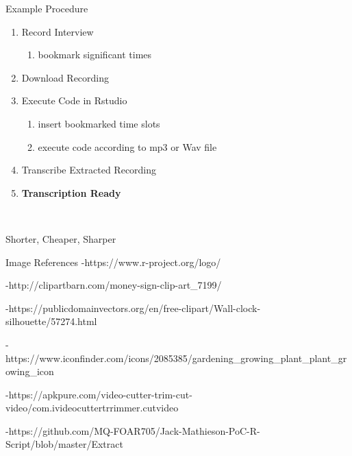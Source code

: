 \documentclass{beamer}
\begin{document}
\begin{frame}{Example Procedure}
\begin{enumerate}[I]
    \item{Record Interview}
\begin{enumerate}
    \item bookmark significant times
\end{enumerate}
    \item{Download Recording}
    \item{Execute Code in Rstudio}
\begin{enumerate}
    \item insert bookmarked time slots
    \item{execute code according to mp3 or Wav file}
\end{enumerate}
    \item{Transcribe Extracted Recording}
    \item{\textbf{Transcription Ready}}
\end{enumerate}
\    

\centering Shorter, Cheaper, Sharper
\end{frame}


\begin{frame}{Image References}
-https://www.r-project.org/logo/

-http://clipartbarn.com/money-sign-clip-art_7199/

-https://publicdomainvectors.org/en/free-clipart/Wall-clock-silhouette/57274.html

-https://www.iconfinder.com/icons/2085385/gardening_growing_plant_plant_growing_icon

-https://apkpure.com/video-cutter-trim-cut-video/com.ivideocuttertrrimmer.cutvideo

-https://github.com/MQ-FOAR705/Jack-Mathieson-PoC-R-Script/blob/master/Extract%
    
\end{frame}
\end{document}
